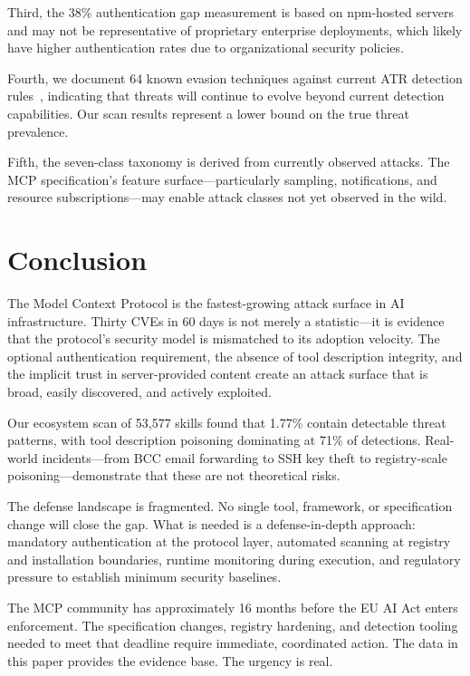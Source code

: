 \documentclass[11pt,twocolumn]{article}
\begin{document}
Third, the 38\% authentication gap measurement is based on npm-hosted servers and may not be representative of proprietary enterprise deployments, which likely have higher authentication rates due to organizational security policies.

Fourth, we document 64 known evasion techniques against current ATR detection rules~\cite{atr-evasions}, indicating that threats will continue to evolve beyond current detection capabilities. Our scan results represent a lower bound on the true threat prevalence.

Fifth, the seven-class taxonomy is derived from currently observed attacks. The MCP specification's feature surface---particularly sampling, notifications, and resource subscriptions---may enable attack classes not yet observed in the wild.

\section{Conclusion}
\label{sec:conclusion}

The Model Context Protocol is the fastest-growing attack surface in AI infrastructure. Thirty CVEs in 60 days is not merely a statistic---it is evidence that the protocol's security model is mismatched to its adoption velocity. The optional authentication requirement, the absence of tool description integrity, and the implicit trust in server-provided content create an attack surface that is broad, easily discovered, and actively exploited.

Our ecosystem scan of 53,577 skills found that 1.77\% contain detectable threat patterns, with tool description poisoning dominating at 71\% of detections. Real-world incidents---from BCC email forwarding to SSH key theft to registry-scale poisoning---demonstrate that these are not theoretical risks.

The defense landscape is fragmented. No single tool, framework, or specification change will close the gap. What is needed is a defense-in-depth approach: mandatory authentication at the protocol layer, automated scanning at registry and installation boundaries, runtime monitoring during execution, and regulatory pressure to establish minimum security baselines.

The MCP community has approximately 16 months before the EU AI Act enters enforcement. The specification changes, registry hardening, and detection tooling needed to meet that deadline require immediate, coordinated action. The data in this paper provides the evidence base. The urgency is real.
\end{document}
